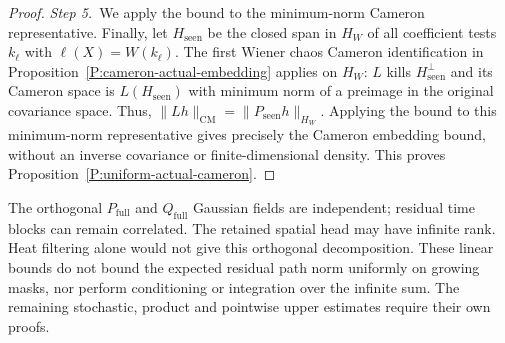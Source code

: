 \begin{proof}
  \medskip
  \noindent\textit{Step 5.~}We apply the bound to the minimum-norm Cameron
  representative.
  Finally, let $H_{\mathrm{seen}}$ be the closed span in $H_W$ of all
  coefficient tests $k_\ell$ with $\ell(X) = W(k_\ell)$. The first Wiener chaos
  Cameron identification in Proposition~\ref{P:cameron-actual-embedding} applies
  on $H_W$: $L$ kills $H_{\mathrm{seen}}^\perp$ and its Cameron space is
  $L(H_{\mathrm{seen}})$ with minimum norm of a preimage in the original
  covariance space. Thus, $\|Lh\|_{\mathrm{CM}} = \|P_{\mathrm{seen}}h\|_{H_W}$.
  Applying the bound to this minimum-norm representative gives precisely the
  Cameron embedding bound, without an inverse covariance or finite-dimensional
  density. This proves Proposition~\ref{P:uniform-actual-cameron}.
\end{proof}

The orthogonal $P_{\mathrm{full}}$ and $Q_{\mathrm{full}}$ Gaussian fields are
independent; residual time blocks can remain correlated. The retained spatial
head may have infinite rank. Heat filtering alone would not give this orthogonal
decomposition. These linear bounds do not bound the expected residual path norm
uniformly on growing masks, nor perform conditioning or integration over the
infinite sum. The remaining stochastic, product and pointwise upper estimates
require their own proofs.
